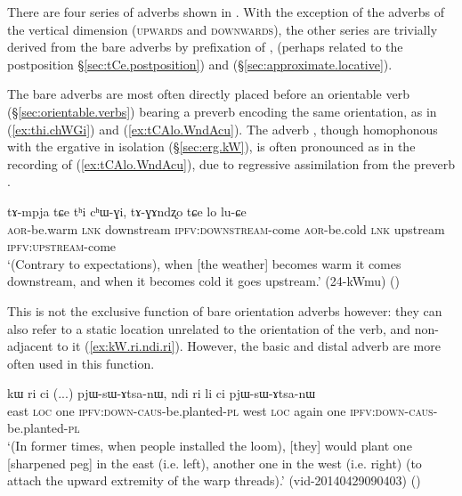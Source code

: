There are four series of adverbs shown in . With the exception of the adverbs of the vertical dimension (\textsc{upwards} and \textsc{downwards}), the other series are trivially derived from the bare adverbs by prefixation of ,  (perhaps related to the postposition  §\ref{sec:tCe.postposition}) and  (§\ref{sec:approximate.locative}).

The bare adverbs are most often directly placed before an orientable verb (§\ref{sec:orientable.verbs}) bearing a preverb encoding the same orientation, as in (\ref{ex:thi.chWGi}) and (\ref{ex:tCAlo.WndAcu}). The adverb , though homophonous with the ergative in isolation (§\ref{sec:erg.kW}), is often pronounced  as in the recording of (\ref{ex:tCAlo.WndAcu}), due to regressive assimilation from the preverb .

 \begin{exe}
\ex \label{ex:thi.chWGi}
\gll tɤ-mpja tɕe tʰi cʰɯ-ɣi, tɤ-ɣɤndʐo tɕe lo lu-ɕe \\
\textsc{aor}-be.warm \textsc{lnk} downstream \textsc{ipfv}:\textsc{downstream}-come \textsc{aor}-be.cold  \textsc{lnk} upstream \textsc{ipfv}:\textsc{upstream}-come \\
\glt `(Contrary to expectations), when [the weather] becomes warm it comes downstream, and when it becomes cold it goes upstream.' (24-kWmu)
()
 \end{exe}

This is not the exclusive function of bare orientation adverbs however: they can also refer to a static location unrelated to the orientation of the verb, and non-adjacent to it (\ref{ex:kW.ri.ndi.ri}). However, the basic and distal adverb are more often used in this function.

\begin{exe}
\ex \label{ex:kW.ri.ndi.ri}
\gll kɯ ri ci (...) pjɯ-sɯ-ɤtsa-nɯ, ndi ri li ci pjɯ-sɯ-ɤtsa-nɯ   \\
east \textsc{loc} one {  } \textsc{ipfv}:\textsc{down}-\textsc{caus}-be.planted-\textsc{pl} 
west \textsc{loc} again one \textsc{ipfv}:\textsc{down}-\textsc{caus}-be.planted-\textsc{pl}  \\
\glt `(In former times, when people installed the loom), [they] would plant one [sharpened peg] in the east (i.e. left), another one in the west (i.e. right) (to attach the upward extremity of the warp threads).' (vid-20140429090403)
	()
 \end{exe}
 
